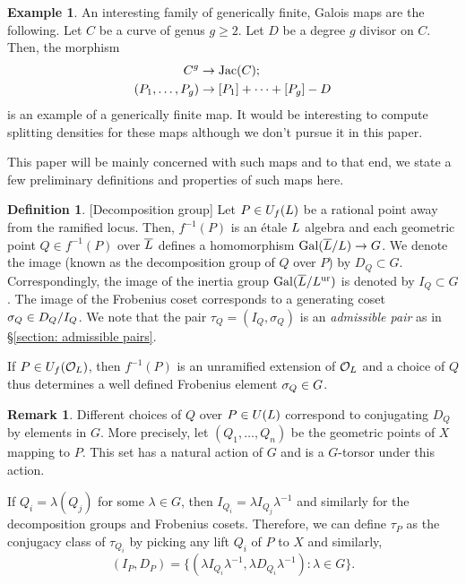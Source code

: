 \documentclass[10pt]{article}
\theoremstyle{plain}
\theoremstyle{definition}
\newtheorem{definition}[theorem]{Definition}
\newtheorem{example}[theorem]{Example}
\newtheorem{remark}[theorem]{Remark}
\numberwithin{equation}{section}
\begin{document}
\begin{example}
An interesting family of generically finite, Galois maps are the following. Let $C$ be a curve of genus $g \geq 2$. Let $D$ be a degree $g$ divisor on $C$. Then, the morphism
\begin{align*}
    C^g &\to \operatorname{Jac}(C);\\
    (P_1,\dots,P_g) &\to [P_1] + \dots + [P_g] - D
\end{align*}
is an example of a generically finite map. It would be interesting to compute splitting densities for these maps although we don't pursue it in this paper.
\end{example}

This paper will be mainly concerned with such maps and to that end, we state a few preliminary definitions and properties of such maps here.

\begin{definition}\label{defn: decomposition group}[Decomposition group]
Let $P \in U_f({L})$ be a rational point away from the ramified locus. Then, $f^{-1}(P)$ is an \'etale ${L}$ algebra and each geometric point $Q \in f^{-1}(P)$ over $\overline{{L}}$ defines a homomorphism $\operatorname{Gal}(\overline{{L}}/{L}) \to G$. We denote the image (known as the decomposition group of $Q$ over $P$) by $D_Q \subset G$. Correspondingly, the image of the inertia group $\operatorname{Gal}(\overline{L}/L^{\mathrm{ur}})$ is denoted by $I_Q \subset G$. The image of the Frobenius coset corresponds to a generating coset $\sigma_Q \in D_Q/I_Q$. We note that the pair $\tau_Q = (I_Q,\sigma_Q)$ is an \emph{admissible pair} as in \S \ref{section: admissible pairs}.

If $P \in U_f({{\mathcal O}_{L}})$, then $f^{-1}(P)$ is an unramified extension of ${{\mathcal O}_{L}}$ and a choice of $Q$ thus determines a well defined Frobenius element $\sigma_Q \in G$.
\end{definition}

\begin{remark}\label{rmk: conjugacy of stuff}
Different choices of $Q$ over $P \in U({L})$ correspond to conjugating $D_Q$ by elements in $G$. More precisely, let $(Q_1,\dots,Q_n)$ be the geometric points of $X$ mapping to $P$. This set has a natural action of $G$ and is a $G$-torsor under this action.

If $Q_i = \lambda(Q_{j})$ for some $\lambda \in G$, then $I_{Q_i} = \lambda I_{Q_j}\lambda^{-1}$ and similarly for the decomposition groups and Frobenius cosets. Therefore, we can define $\tau_P$ as the conjugacy class of $\tau_{Q_i}$ by picking any lift $Q_i$ of $P$ to $X$ and similarly,
\[(I_P,D_P) = \{(\lambda I_{Q_i}\lambda^{-1},\lambda D_{Q_i}\lambda^{-1}) : \lambda \in G\}.\]
\end{remark}
\end{document}

